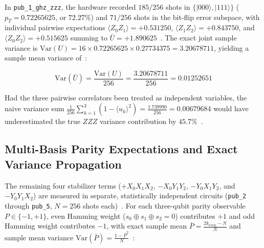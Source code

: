 \documentclass[10pt,letterpaper]{article}
\begin{document}
In \texttt{pub\_1\_ghz\_zzz}, the hardware recorded $185/256$ shots in $\{\vert 000 \rangle, \vert 111 \rangle\}$ ($p_T = 0.72265625$, or $72.27\%$) and $71/256$ shots in the bit-flip error subspace, with individual pairwise expectations $\langle Z_0 Z_1 \rangle = +0.531250$, $\langle Z_1 Z_2 \rangle = +0.843750$, and $\langle Z_0 Z_2 \rangle = +0.515625$ summing to $\bar{U} = +1.890625$~\cite{qfx_doc}. The exact joint sample variance is $\mathrm{Var}(U) = 16 \times 0.72265625 \times 0.27734375 = 3.20678711$, yielding a sample mean variance of~\cite{qfx_doc}:

\begin{equation}
\mathrm{Var}(\bar{U}) = \frac{\mathrm{Var}(U)}{256} = \frac{3.20678711}{256} = 0.01252651
\end{equation}

Had the three pairwise correlators been treated as independent variables, the naive variance sum $\frac{1}{256}\sum_{k=1}^{3}(1 - \langle u_k \rangle^2) = \frac{1.739990}{256} = 0.00679684$ would have underestimated the true $ZZZ$ variance contribution by $45.7\%$~\cite{qfx_doc}.

\subsection{Multi-Basis Parity Expectations and Exact Variance Propagation}

The remaining four stabilizer terms ($+X_0 X_1 X_2$, $-X_0 Y_1 Y_2$, $-Y_0 X_1 Y_2$, and $-Y_0 Y_1 X_2$) are measured in separate, statistically independent circuits (\texttt{pub\_2} through \texttt{pub\_5}, $N = 256$ shots each)~\cite{qfx_doc}. For each three-qubit parity observable $P \in \{-1, +1\}$, even Hamming weight ($s_0 \oplus s_1 \oplus s_2 = 0$) contributes $+1$ and odd Hamming weight contributes $-1$, with exact sample mean $\bar{P} = \frac{2 k_{\text{even}} - N}{N}$ and sample mean variance $\mathrm{Var}(\bar{P}) = \frac{1 - \bar{P}^2}{N}$~\cite{qfx_doc}:
\end{document}
